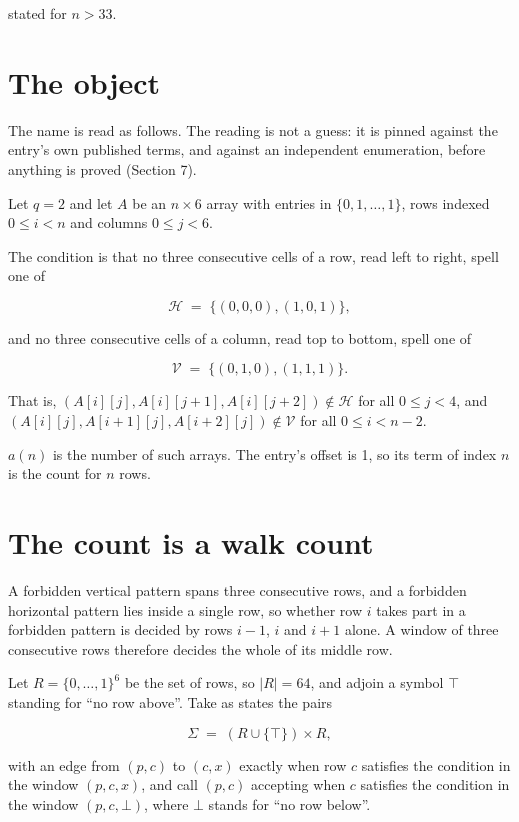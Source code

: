 \documentclass[11pt]{article}
\theoremstyle{definition}
\begin{document}
stated for $n > 33$.

\section{The object}

The name is read as follows. The reading is not a guess: it is pinned against the entry's own published terms, and against an independent enumeration, before anything is proved (Section 7).

Let $q = 2$ and let $A$ be an $n \times 6$ array with entries in $\{0,1,\dots,1\}$, rows indexed $0 \le i < n$ and columns $0 \le j < 6$.

The condition is that no three consecutive cells of a row, read left to right, spell one of

\[\mathcal{H} \;=\; \{(0,0,0), (1,0,1)\},\]

and no three consecutive cells of a column, read top to bottom, spell one of

\[\mathcal{V} \;=\; \{(0,1,0), (1,1,1)\}.\]

That is, $(A[i][j],A[i][j{+}1],A[i][j{+}2]) \notin \mathcal{H}$ for all $0 \le j < 4$, and $(A[i][j],A[i{+}1][j],A[i{+}2][j]) \notin \mathcal{V}$ for all $0 \le i < n-2$.

$a(n)$ is the number of such arrays. The entry's offset is 1, so its term of index $n$ is the count for $n$ rows.

\section{The count is a walk count}

A forbidden vertical pattern spans three consecutive rows, and a forbidden horizontal pattern lies inside a single row, so whether row $i$ takes part in a forbidden pattern is decided by rows $i-1$, $i$ and $i+1$ alone. A window of three consecutive rows therefore decides the whole of its middle row.

Let $R = \{0,\dots,1\}^{6}$ be the set of rows, so $|R| = 64$, and adjoin a symbol $\top$ standing for ``no row above''. Take as states the pairs

\[\Sigma \;=\; (R \cup \{\top\}) \times R,\]

with an edge from $(p,c)$ to $(c,x)$ exactly when row $c$ satisfies the condition in the window $(p,c,x)$, and call $(p,c)$ accepting when $c$ satisfies the condition in the window $(p,c,\bot)$, where $\bot$ stands for ``no row below''.
\end{document}

